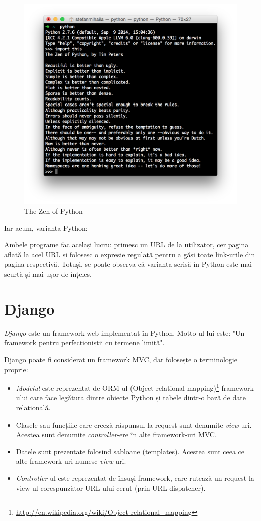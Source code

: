 \begin{figure}
  \includegraphics[width=1\textwidth]{./zen}
  \caption{The Zen of Python}
  \label{fig:zen}
\end{figure}



Iar acum, varianta Python:


Ambele programe fac același lucru: primesc un URL de la utilizator, cer pagina
aflată la acel URL și folosesc o expresie regulată pentru a găsi toate link-urile
din pagina respectivă. Totuși, se poate observa că varianta scrisă în Python
este mai scurtă și mai ușor de înțeles.


\section{Django}

\emph{Django} este un framework web implementat în Python. Motto-ul lui este: 
"Un framework pentru perfecționiștii cu termene limită".

Django poate fi considerat un framework MVC, dar folosește o terminologie proprie:
\begin{itemize}
\item \emph{Modelul} este reprezentat de ORM-ul (Object-relational mapping)\footnote{\url{http://en.wikipedia.org/wiki/Object-relational\_mapping}} framework-ului care face legătura dintre obiecte Python și tabele dintr-o bază de date relațională.
\item Clasele sau funcțiile care creeză răspunsul la request sunt denumite \emph{view}-uri. Acestea sunt denumite \emph{controller}-ere în alte framework-uri MVC.
\item Datele sunt prezentate folosind șabloane (templates). Acestea sunt ceea ce alte framework-uri numesc \emph{view}-uri.
\item \emph{Controller}-ul este reprezentat de însuși framework, care rutează
un request la view-ul corespunzător URL-ului cerut (prin URL dispatcher).
\end{itemize}
